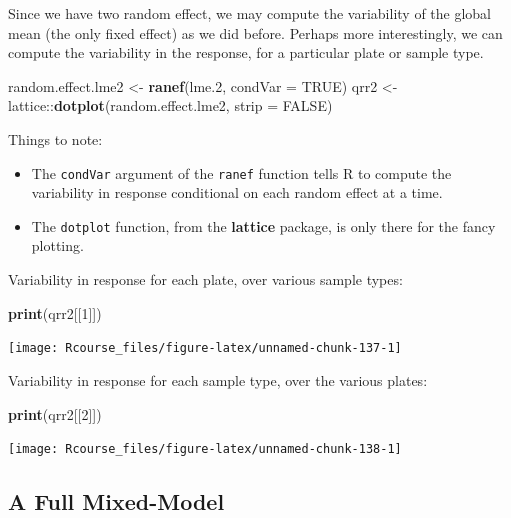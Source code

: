 \documentclass[]{book}
\newenvironment{Shaded}{\begin{snugshade}}{\end{snugshade}}
\newcommand{\KeywordTok}[1]{\textcolor[rgb]{0.13,0.29,0.53}{\textbf{{#1}}}}
\newcommand{\DataTypeTok}[1]{\textcolor[rgb]{0.13,0.29,0.53}{{#1}}}
\newcommand{\DecValTok}[1]{\textcolor[rgb]{0.00,0.00,0.81}{{#1}}}
\newcommand{\FloatTok}[1]{\textcolor[rgb]{0.00,0.00,0.81}{{#1}}}
\newcommand{\StringTok}[1]{\textcolor[rgb]{0.31,0.60,0.02}{{#1}}}
\newcommand{\OtherTok}[1]{\textcolor[rgb]{0.56,0.35,0.01}{{#1}}}
\newcommand{\NormalTok}[1]{{#1}}
\providecommand{\tightlist}{%
  \setlength{\itemsep}{0pt}\setlength{\parskip}{0pt}}
\theoremstyle{definition}
\theoremstyle{definition}
\theoremstyle{remark}
\begin{document}
Since we have two random effect, we may compute the variability of the
global mean (the only fixed effect) as we did before. Perhaps more
interestingly, we can compute the variability in the response, for a
particular plate or sample type.

\begin{Shaded}
\begin{Highlighting}[]
\NormalTok{random.effect.lme2 <-}\StringTok{ }\KeywordTok{ranef}\NormalTok{(lme}\FloatTok{.2}\NormalTok{, }\DataTypeTok{condVar =} \OtherTok{TRUE}\NormalTok{) }
\NormalTok{qrr2 <-}\StringTok{ }\NormalTok{lattice::}\KeywordTok{dotplot}\NormalTok{(random.effect.lme2, }\DataTypeTok{strip =} \OtherTok{FALSE}\NormalTok{)}
\end{Highlighting}
\end{Shaded}

Things to note:

\begin{itemize}
\tightlist
\item
  The \texttt{condVar} argument of the \texttt{ranef} function tells R
  to compute the variability in response conditional on each random
  effect at a time.
\item
  The \texttt{dotplot} function, from the \textbf{lattice} package, is
  only there for the fancy plotting.
\end{itemize}

Variability in response for each plate, over various sample types:

\begin{Shaded}
\begin{Highlighting}[]
\KeywordTok{print}\NormalTok{(qrr2[[}\DecValTok{1}\NormalTok{]]) }
\end{Highlighting}
\end{Shaded}

\texttt{[image: Rcourse\_files/figure-latex/unnamed-chunk-137-1]}

Variability in response for each sample type, over the various plates:

\begin{Shaded}
\begin{Highlighting}[]
\KeywordTok{print}\NormalTok{(qrr2[[}\DecValTok{2}\NormalTok{]])  }
\end{Highlighting}
\end{Shaded}

\texttt{[image: Rcourse\_files/figure-latex/unnamed-chunk-138-1]}

\subsection{A Full Mixed-Model}\label{a-full-mixed-model}
\end{document}

